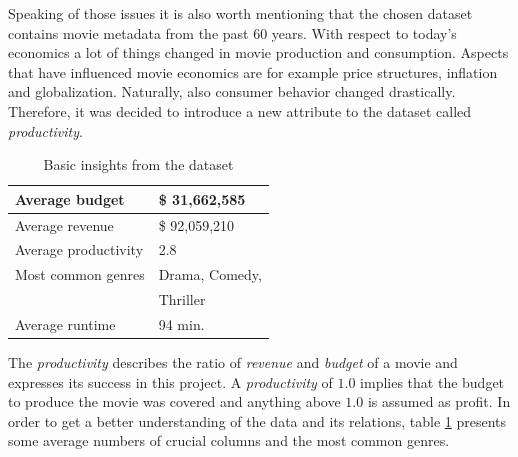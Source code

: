 Speaking of those issues it is also worth mentioning that the chosen dataset contains movie metadata from the past 60 years. With respect to today's economics a lot of things changed in movie production and consumption. Aspects that have influenced movie economics are for example price structures, inflation and globalization. Naturally, also consumer behavior changed drastically. Therefore, it was decided to introduce a new attribute to the dataset called \textit{productivity}. 
\begin{table}
	\begin{tabular}{| l | l |}
	\hline
	Average budget & \$ 31,662,585 \\ \hline
	Average revenue & \$ 92,059,210 \\ \hline
	Average productivity & 2.8 \\ \hline
	Most common genres & Drama, Comedy,\\ & Thriller \\ \hline
	Average runtime & 94 min. \\ \hline
	\end{tabular}
	\caption{Basic insights from the dataset}
	\label{tbl:insights}
\end{table} 
The \textit{productivity} describes the ratio of \textit{revenue} and \textit{budget} of a movie and expresses its success in this project. A \textit{productivity} of $1.0$ implies that the budget to produce the movie was covered and anything above $1.0$ is assumed as profit.
In order to get a better understanding of the data and its relations, table \ref{tbl:insights} presents some average numbers of crucial columns and the most common genres.
